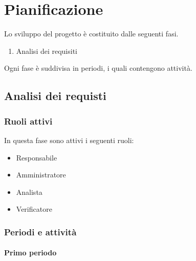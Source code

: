 \section{Pianificazione}
Lo sviluppo del progetto è costituito dalle seguenti fasi.
\begin{enumerate}
	\item Analisi dei requisiti
\end{enumerate}
Ogni fase è suddivisa in periodi, i quali contengono attività.

\subsection{Analisi dei requisti}

\subsubsection{Ruoli attivi}
In questa fase sono attivi i seguenti ruoli:
\begin{itemize}
	\item Responsabile
	\item Amministratore
	\item Analista
	\item Verificatore
\end{itemize}

\subsubsection{Periodi e attività}

\paragraph{Primo periodo}


